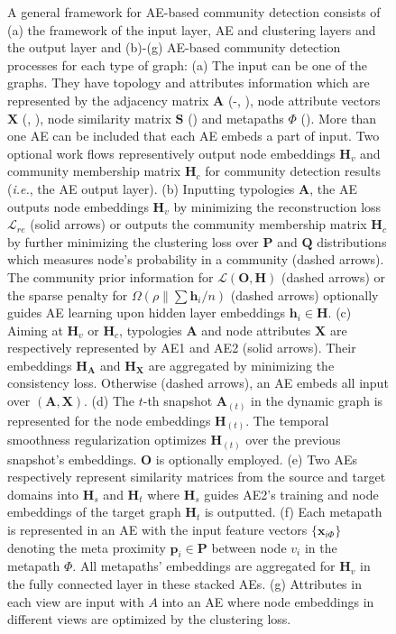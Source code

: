 \begin{figure}[!t]
\caption{\footnotesize A general framework for AE-based community detection consists of (a) the framework of the input layer, AE and clustering layers and the output layer and (b)-(g) AE-based community detection processes for each type of graph: (a) The input can be one of the graphs. They have topology and attributes information which are represented by the adjacency matrix $\bm{A}$ (-, ), node attribute vectors $\bm{X}$ (, ), node similarity matrix $\bm{S}$ () and metapaths $\Phi$ (). More than one AE can be included that each AE embeds a part of input. Two optional work flows representively output node embeddings $\bm{H}_v$ and community membership matrix $\bm{H}_c$ for community detection results (\textit{i.e.}, the AE output layer). (b) Inputting typologies $\bm{A}$, the AE outputs node embeddings $\bm{H}_{v}$ by minimizing the reconstruction loss $\mathcal{L}_{re}$ (solid arrows) or outputs the community membership matrix $\bm{H}_{c}$ by further minimizing the clustering loss over $\bm{P}$ and $\bm{Q}$ distributions which measures node's probability in a community (dashed arrows). The community prior information for $\mathcal{L}(\bm{O},\bm{H})$ (dashed arrows) or the sparse penalty for $\Omega(\rho\|\sum{\bm{h}_{i}/n})$ (dashed arrows) optionally guides AE learning upon hidden layer embeddings $\bm{h}_{i} \in \bm{H}$. (c) Aiming at $\bm{H}_{v}$ or $\bm{H}_{c}$, typologies $\bm{A}$ and node attributes $\bm{X}$ are respectively represented by AE1 and AE2 (solid arrows). Their embeddings $\bm{H}_{\bm{A}}$ and $\bm{H}_{\bm{X}}$ are aggregated by minimizing the consistency loss. Otherwise (dashed arrows), an AE embeds all input over $(\bm{A},\bm{X})$. (d) The $t$-th snapshot $\bm{A}_{(t)}$ in the dynamic graph is represented for the node embeddings $\bm{H}_{(t)}$. The temporal smoothness regularization optimizes $\bm{H}_{(t)}$ over the previous snapshot's embeddings. $\bm{O}$ is optionally employed. (e) Two AEs respectively represent similarity matrices from the source and target domains into $\bm{H}_{s}$ and $\bm{H}_{t}$ where $\bm{H}_{s}$ guides AE2's training and node embeddings of the target graph $\bm{H}_{t}$ is outputted. (f) Each metapath is represented in an AE with the input feature vectors $\{\bm{x}_{i\Phi}\}$ denoting the meta proximity $\bm{p}_{i} \in \bm{P}$ between node $v_{i}$ in the metapath $\Phi$. All metapaths' embeddings are aggregated for $\bm{H}_{v}$ in the fully connected layer in these stacked AEs. (g) Attributes in each view are input with $A$ into an AE where node embeddings in different views are optimized by the clustering loss.}
\label{fig-stacked-ae}
\end{figure}
